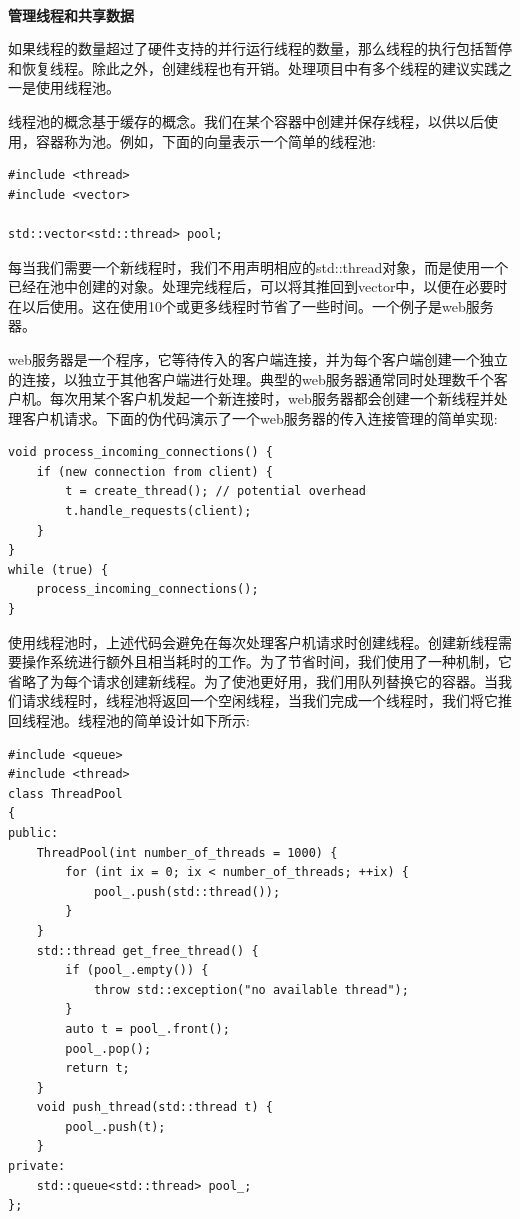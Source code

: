 \noindent\textbf{}\ \par
\textbf{管理线程和共享数据} \ \par
如果线程的数量超过了硬件支持的并行运行线程的数量，那么线程的执行包括暂停和恢复线程。除此之外，创建线程也有开销。处理项目中有多个线程的建议实践之一是使用线程池。 \par
线程池的概念基于缓存的概念。我们在某个容器中创建并保存线程，以供以后使用，容器称为池。例如，下面的向量表示一个简单的线程池: \par

\begin{lstlisting}[caption={}]
#include <thread>
#include <vector>

std::vector<std::thread> pool;
\end{lstlisting}

每当我们需要一个新线程时，我们不用声明相应的std::thread对象，而是使用一个已经在池中创建的对象。处理完线程后，可以将其推回到vector中，以便在必要时在以后使用。这在使用10个或更多线程时节省了一些时间。一个例子是web服务器。 \par
web服务器是一个程序，它等待传入的客户端连接，并为每个客户端创建一个独立的连接，以独立于其他客户端进行处理。典型的web服务器通常同时处理数千个客户机。每次用某个客户机发起一个新连接时，web服务器都会创建一个新线程并处理客户机请求。下面的伪代码演示了一个web服务器的传入连接管理的简单实现: \par

\begin{lstlisting}[caption={}]
void process_incoming_connections() {
	if (new connection from client) {
		t = create_thread(); // potential overhead
		t.handle_requests(client);
	}
}
while (true) {
	process_incoming_connections();
}
\end{lstlisting}

使用线程池时，上述代码会避免在每次处理客户机请求时创建线程。创建新线程需要操作系统进行额外且相当耗时的工作。为了节省时间，我们使用了一种机制，它省略了为每个请求创建新线程。为了使池更好用，我们用队列替换它的容器。当我们请求线程时，线程池将返回一个空闲线程，当我们完成一个线程时，我们将它推回线程池。线程池的简单设计如下所示: \par

\begin{lstlisting}[caption={}]
#include <queue>
#include <thread>
class ThreadPool
{
public:
	ThreadPool(int number_of_threads = 1000) {
		for (int ix = 0; ix < number_of_threads; ++ix) {
			pool_.push(std::thread());
		}
	}
	std::thread get_free_thread() {
		if (pool_.empty()) {
			throw std::exception("no available thread");
		}
		auto t = pool_.front();
		pool_.pop();
		return t;
	}
	void push_thread(std::thread t) {
		pool_.push(t);
	}
private:
	std::queue<std::thread> pool_;
};
\end{lstlisting}

